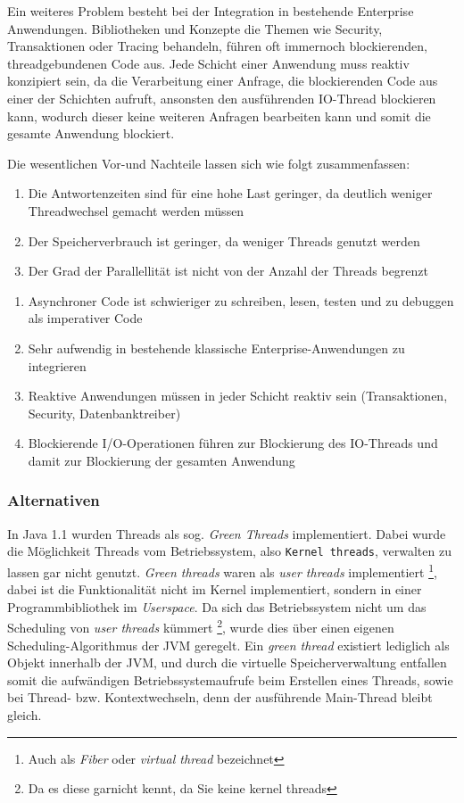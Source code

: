 Ein weiteres Problem besteht bei der Integration in bestehende Enterprise Anwendungen. Bibliotheken und Konzepte die Themen wie
Security, Transaktionen oder Tracing behandeln, führen oft immernoch blockierenden, threadgebundenen Code aus.
Jede Schicht einer Anwendung muss reaktiv konzipiert sein, da die Verarbeitung einer Anfrage, die blockierenden Code aus einer der
Schichten aufruft, ansonsten den ausführenden IO-Thread blockieren kann, wodurch dieser keine weiteren Anfragen bearbeiten kann und somit die gesamte Anwendung blockiert.

Die wesentlichen Vor-und Nachteile lassen sich wie folgt zusammenfassen:
\begin{enumerate}
	\item Die Antwortenzeiten sind für eine hohe Last geringer, da deutlich weniger Threadwechsel gemacht werden müssen
	\item Der Speicherverbrauch ist geringer, da weniger Threads genutzt werden
	\item Der Grad der Parallellität ist nicht von der Anzahl der Threads begrenzt
\end{enumerate}

\begin{enumerate}
	\item Asynchroner Code ist schwieriger zu schreiben, lesen, testen und zu debuggen als imperativer Code
	\item Sehr aufwendig in bestehende klassische Enterprise-Anwendungen zu integrieren
	\item Reaktive Anwendungen müssen in jeder Schicht reaktiv sein (Transaktionen, Security, Datenbanktreiber)
	\item Blockierende I/O-Operationen führen zur Blockierung des IO-Threads und damit zur Blockierung der gesamten Anwendung
\end{enumerate}

\subsubsection{Alternativen}
\label{section:alternativen}
In Java 1.1 wurden Threads als sog. \textit{Green Threads} implementiert. Dabei wurde die Möglichkeit Threads vom Betriebssystem, also \verb|Kernel threads|,
verwalten zu lassen gar nicht genutzt.
\textit{Green threads} waren als \textit{user threads} implementiert \footnote{Auch als \textit{Fiber} oder \textit{virtual thread} bezeichnet},
dabei ist die Funktionalität
nicht im Kernel implementiert, sondern in einer Programmbibliothek im \textit{Userspace}.
Da sich das Betriebssystem nicht um das Scheduling von \textit{user threads} kümmert
\footnote{Da es diese garnicht kennt, da Sie keine kernel threads}, wurde dies über einen eigenen Scheduling-Algorithmus der JVM
geregelt.\parencite{Oracle2010}
Ein \textit{green thread} existiert lediglich als Objekt innerhalb der JVM, und durch die virtuelle Speicherverwaltung entfallen somit
die aufwändigen Betriebssystemaufrufe beim
Erstellen eines Threads, sowie bei Thread- bzw. Kontextwechseln, denn der ausführende Main-Thread bleibt gleich.


